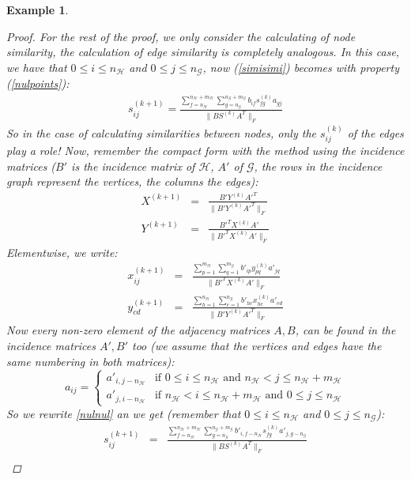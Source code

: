 \documentclass[a4paper,11pt]{report}
\newtheorem{example}[theorem]{Example}
\newcommand{\hgraf}{\mathcal{G}}
\newcommand{\hgrafeen}{\mathcal{H}}
\begin{document}
\begin{example}
\begin{proof}
For the rest of the proof, we only consider the calculating of node similarity, the calculation 
of edge similarity is completely analogous. In this case, we have that $0 \leq i \leq n_\hgrafeen$
 and $0 \leq j \leq n_\hgraf$, now (\ref{simisimi}) becomes with property 
 (\ref{nulpoints}):
\begin{eqnarray}s^{(k+1)}_{ij} = \frac{\sum^{n_\hgrafeen + m_\hgrafeen}_{f=n_\hgrafeen}\sum^{n_\hgraf + m_\hgraf}_{g=n_\hgraf} 
b_{if}s^{(k)}_{fg}a_{gj}}{\|BS^{(k)}A^T\|_F}\label{nulnul}\end{eqnarray}
So in the case of calculating similarities between nodes, only the $s_{ij}^{(k)}$ of 
the edges play a role! Now, remember the compact form with the method using the incidence 
matrices ($B'$ is the incidence matrix of $\hgrafeen$, $A'$ of $\hgraf$, the rows in the incidence graph
represent the vertices, the columns the edges):
 \begin{eqnarray}
   X^{(k+1)} &=& \frac{B'Y^{(k)}A'^T}{\|B'Y^{(k)}A'^T\|_F}\\
     Y^{(k+1)} &=& \frac{B'^TX^{(k)}A'}{\|B'^TX^{(k)}A'\|_F}
 \end{eqnarray}
 Elementwise, we write:
 \begin{eqnarray}
  x^{(k+1)}_{ij} &=& \frac{\sum^{m_\hgrafeen}_{p=1}\sum^{m_\hgraf}_{q=1} b'_{ip}y^{(k)}_{pq}a'_{jq}}{\|B'^TX^{(k)}A'\|_F}\label{ikmoetgelijkzijn}\\
  y^{(k+1)}_{cd} &=& \frac{\sum^{n_\hgrafeen}_{h=1}\sum^{n_\hgraf}_{e=1} b'_{hc}x^{(k)}_{he}a'_{ed}}{\|B'Y^{(k)}A'^T\|_F}
 \end{eqnarray}
 Now every non-zero element of the adjacency matrices $A, B$, can be found in the 
 incidence matrices $A', B'$ too (we assume that the vertices and edges have the same numbering in both 
 matrices):
 $$ a_{ij} = \begin{cases} a'_{i,j-n_\hgrafeen} &\text{if } 0\leq i \leq n_\hgrafeen  \text{ and } n_\hgrafeen < j \leq n_\hgrafeen + m_\hgrafeen\\ 
a'_{j,i-n_\hgrafeen} & \text{if } n_\hgrafeen < i \leq n_\hgrafeen + m_\hgrafeen \text{ and } 0 \leq j \leq n_\hgrafeen\end{cases} $$
So we rewrite \ref{nulnul} an we get (remember that $0 \leq i \leq n_\hgrafeen$
 and $0 \leq j \leq n_\hgraf$):
\begin{eqnarray}
  s^{(k+1)}_{ij} &=& \frac{\sum^{n_\hgrafeen + m_\hgrafeen}_{f=n_\hgrafeen}\sum^{n_\hgraf + m_\hgraf}_{g=n_\hgraf} 
b'_{i,f-n_\hgrafeen}s^{(k)}_{fg}a'_{j,g-n_\hgraf}}{\|BS^{(k)}A^T\|_F}\\

\end{eqnarray}
\end{proof}
\end{example}
\end{document}
